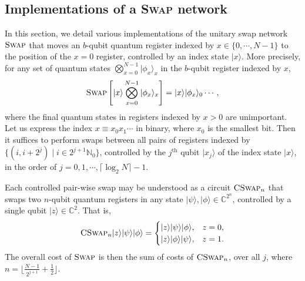 \documentclass[a4paper,onecolumn,10pt,accepted=2024-05-22]{quantumarticle}
\newcommand{\ket}[1]{| #1\rangle}        %
\begin{document}
	\subsection{Implementations of a \textsc{Swap} network}
	\label{sec:swap}
	In this section, we detail various implementations of the unitary swap network $\textsc{Swap}$ that moves an $b$-qubit quantum register indexed by $x\in\{0,\cdots,N-1\}$ to the position of the $x=0$ register, controlled by an index state $\ket{x}$. More precisely, for any set of quantum states $\bigotimes_{x=0}^{N-1}\ket{\phi_x}_x$ in the $b$-qubit register indexed by $x$,
	\begin{align}
	\textsc{Swap}\left[\ket{x}\bigotimes_{x=0}^{N-1}\ket{\phi_x}_x\right]=\ket{x}\ket{\phi_x}_0 \cdots,
	\end{align}
	where the final quantum states in registers indexed by $x>0$ are unimportant. Let us express the index ${x}\equiv x_0 x_1\cdots$ in binary, where $x_0$ is the smallest bit. Then it suffices to perform swaps between all pairs of registers indexed by $\{(i, i+2^j)\;|\;i\in 2^{j+1} \mathbb{N}_0  \}$, controlled by the $j^{\textrm{th}}$ qubit $\ket{x_j}$ of the index state $\ket{x}$, in the order of $j=0,1,\cdots,\lceil\log_2{N}\rceil-1$. 
	
	Each controlled pair-wise swap may be understood as a circuit $\textsc{CSwap}_n$ that swaps two $n$-qubit quantum registers in any state $\ket{\psi},\ket{\phi}\in\mathbb{C}^{2^n}$, controlled by a single qubit $\ket{z}\in\mathbb{C}^{2}$. That is,
	\begin{align}
	\label{eq:swap_controlled}
	\textsc{CSwap}_n\ket{z}\ket{\psi}\ket{\phi}=\begin{cases}
	\ket{z}\ket{\psi}\ket{\phi}, & z=0,\\
	\ket{z}\ket{\phi}\ket{\psi}, & z=1.
	\end{cases}
	\end{align}
	The overall cost of $\textsc{Swap}$ is then the sum of costs of $\textsc{CSwap}_n$, over all $j$, where $n=\lfloor\frac{N-1}{2^{j+1}}+\frac{1}{2}\rfloor$.
	
\end{document}
